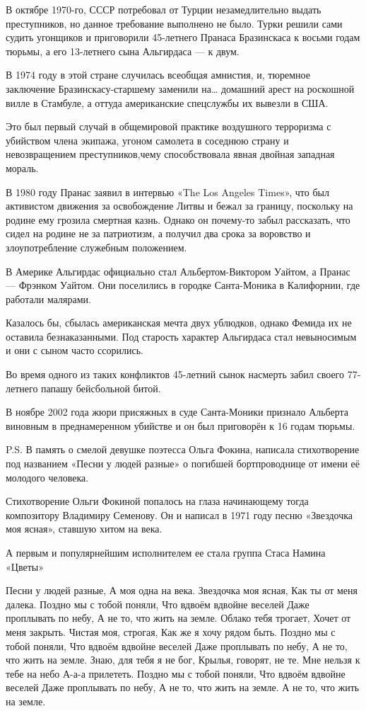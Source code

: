 В октябре 1970-го, СССР потребовал от Турции незамедлительно выдать
преступников, но данное требование выполнено не было. Турки решили сами судить
угонщиков и приговорили 45-летнего Пранаса Бразинскаса к восьми годам тюрьмы, а
его 13-летнего сына Альгирдаса — к двум.

В 1974 году в этой стране случилась всеобщая амнистия, и, тюремное заключение
Бразинскасу-старшему заменили на… домашний арест на роскошной вилле в Стамбуле,
а оттуда американские спецслужбы их вывезли в США.

Это был первый случай в общемировой практике воздушного терроризма с убийством
члена экипажа, угоном самолета в соседнюю страну и невозвращением
преступников,чему способствовала явная двойная западная мораль.

В 1980 году Пранас заявил в интервью «The Los Angeles Times», что был
активистом движения за освобождение Литвы и бежал за границу, поскольку на
родине ему грозила смертная казнь. Однако он почему-то забыл рассказать, что
сидел на родине не за патриотизм, а получил два срока за воровство и
злоупотребление служебным положением.

В Америке Альгирдас официально стал Альбертом-Виктором Уайтом, а Пранас —
Фрэнком Уайтом. Они поселились в городке Санта-Моника в Калифорнии, где
работали малярами.

Казалось бы, сбылась американская мечта двух ублюдков, однако Фемида их не
оставила безнаказанными. Под старость характер Альгирдаса стал невыносимым и
они с сыном часто ссорились.

Во время одного из таких конфликтов 45-летний сынок насмерть забил своего
77-летнего папашу бейсбольной битой.

В ноябре 2002 года жюри присяжных в суде Санта-Моники признало Альберта
виновным в преднамеренном убийстве и он был приговорён к 16 годам тюрьмы.

P.S. В память о смелой девушке поэтесса Ольга Фокина, написала стихотворение
под названием «Песни у людей разные» о погибшей бортпроводнице от имени её
молодого человека.


Стихотворение Ольги Фокиной попалось на глаза начинающему тогда композитору
Владимиру Семенову. Он и написал в 1971 году песню «Звездочка моя ясная»,
ставшую хитом на века.

А первым и популярнейшим исполнителем ее стала группа Стаса Намина «Цветы»

Песни у людей разные,
А моя одна на века.
Звездочка моя ясная,
Как ты от меня далека.
Поздно мы с тобой поняли,
Что вдвоём вдвойне веселей
Даже проплывать по небу,
А не то, что жить на земле.
Облако тебя трогает,
Хочет от меня закрыть.
Чистая моя, строгая,
Как же я хочу рядом быть.
Поздно мы с тобой поняли,
Что вдвоём вдвойне веселей
Даже проплывать по небу,
А не то, что жить на земле.
Знаю, для тебя я не бог,
Крылья, говорят, не те.
Мне нельзя к тебе на небо
А-а-а прилететь.
Поздно мы с тобой поняли,
Что вдвоём вдвойне веселей
Даже проплывать по небу,
А не то, что жить на земле.
А не то, что жить на земле.

